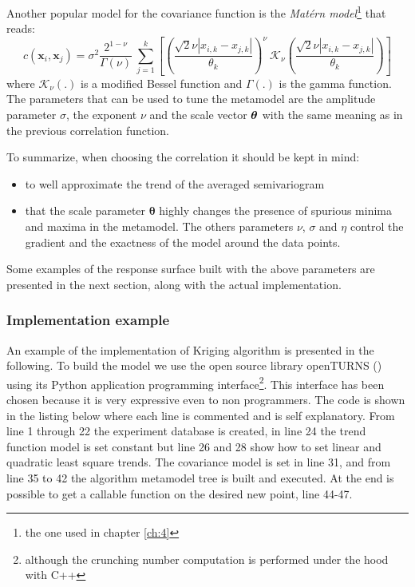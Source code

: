 Another popular model for the covariance function is the \textit{Mat\'ern model}\footnote{the one used in chapter \ref{ch:4}} that reads:
\begin{equation}
c(\mathbf{x}_{i} , \mathbf{x}_{j}) = \sigma^2 \dfrac{2^{1- \nu}}{\Gamma(\nu)} \ \sum_{j=1}^{k} \left[ \left( \dfrac{\sqrt{2} \nu |{x}_{i,k} - {x}_{j,k} |}{\theta_k} \right)^{\nu} \ \mathcal{K}_{\nu}\left( \dfrac{\sqrt{2} \nu |{x}_{i,k} - {x}_{j,k} |}{\theta_k} \right) \right]
\label{eq:matern2}
\end{equation}
where $\mathcal{K}_{\nu}(.)$ is a modified Bessel function and $\Gamma(.)$ is the gamma function.
The parameters that can be used to tune the metamodel are the amplitude parameter $\sigma$, the exponent $\nu$ and the scale vector $\boldsymbol{\theta}$ with the same meaning as in the previous correlation function.

To summarize, when choosing the correlation it should be kept in mind:
\begin{itemize}
	\item to well approximate the trend of the averaged semivariogram
	\item that the scale parameter $\boldsymbol{\theta}$ highly changes the presence of spurious minima and maxima in the metamodel. The others parameters $\nu$, $\sigma$ and $\eta$ control the gradient and the exactness of the model around the data points.
\end{itemize}

Some examples of the response surface built with the above parameters are presented in the next section, along with the actual implementation.

\subsubsection{Implementation example}
An example of the implementation of Kriging algorithm is presented in the following. To build the model we use the open source library openTURNS (\citet{openturns}) using its Python application programming interface\footnote{although the crunching number computation is performed under the hood with C++}. This interface has been chosen because it is very expressive even to non programmers. 
The code is shown in the listing below where each line is commented and is self explanatory. From line 1 through 22 the experiment database is created, in line 24 the trend function model is set constant but line 26 and 28 show how to set linear and quadratic least square trends. The covariance model is set in line 31, and from line 35 to 42 the algorithm metamodel tree is built and executed. At the end is possible to get a callable function on the desired new point, line 44-47.

